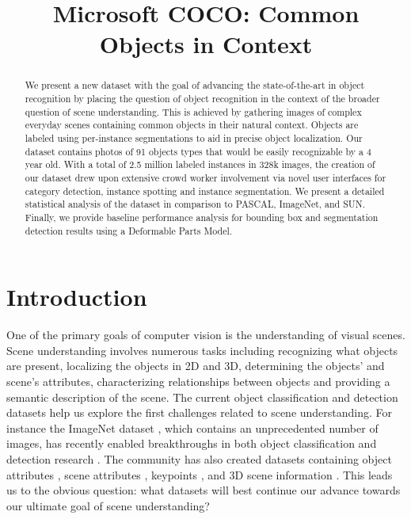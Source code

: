 \title{Microsoft COCO: Common Objects in Context}

\begin{abstract}
We present a new dataset with the goal of advancing the state-of-the-art in object recognition by placing the question of object recognition in the context of the broader question of scene understanding. This is achieved by gathering images of complex everyday scenes containing common objects in their natural context. Objects are labeled using per-instance segmentations to aid in precise object localization. Our dataset contains photos of 91 objects types that would be easily recognizable by a 4 year old. With a total of 2.5 million labeled instances in 328k images, the creation of our dataset drew upon extensive crowd worker involvement via novel user interfaces for category detection, instance spotting and instance segmentation. We present a detailed statistical analysis of the dataset in comparison to PASCAL, ImageNet, and SUN. Finally, we provide baseline performance analysis for bounding box and segmentation detection results using a Deformable Parts Model.
\end{abstract}

\section{Introduction}

One of the primary goals of computer vision is the understanding of visual scenes. Scene understanding involves numerous tasks including recognizing what objects are present, localizing the objects in 2D and 3D, determining the objects' and scene's attributes, characterizing relationships between objects and providing a semantic description of the scene. The current object classification and detection datasets \cite{Imagenet,PASCAL,SUN,Dollar2012PAMI} help us explore the first challenges related to scene understanding. For instance the ImageNet dataset \cite{Imagenet}, which contains an unprecedented number of images, has recently enabled breakthroughs in both object classification and detection research \cite{Hinton,GirshickDDM13,OverFeat}. The community has also created datasets containing object attributes \cite{farhadi2009describing}, scene attributes \cite{Patterson2012SunAttributes}, keypoints \cite{bourdev2009poselets}, and 3D scene information \cite{NYUDepth}. This leads us to the obvious question: what datasets will best continue our advance towards our ultimate goal of scene understanding?

